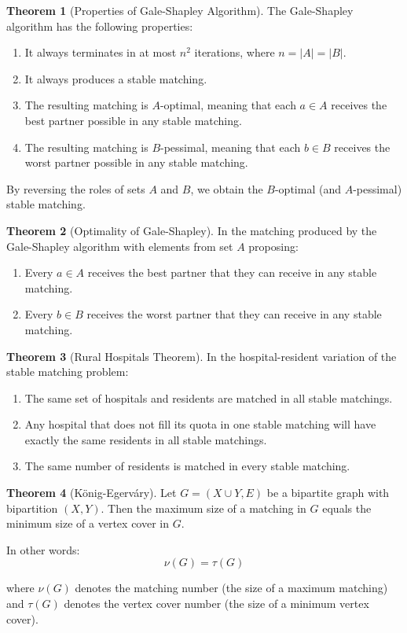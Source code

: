 \documentclass{article}
\theoremstyle{definition}
\newtheorem{theorem}{Theorem}
\begin{document}
\begin{theorem}[Properties of Gale-Shapley Algorithm]
The Gale-Shapley algorithm has the following properties:
\begin{enumerate}
    \item It always terminates in at most $n^2$ iterations, where $n = |A| = |B|$.
    \item It always produces a stable matching.
    \item The resulting matching is $A$-optimal, meaning that each $a \in A$ receives the best partner possible in any stable matching.
    \item The resulting matching is $B$-pessimal, meaning that each $b \in B$ receives the worst partner possible in any stable matching.
\end{enumerate}

By reversing the roles of sets $A$ and $B$, we obtain the $B$-optimal (and $A$-pessimal) stable matching.
\end{theorem}

\begin{theorem}[Optimality of Gale-Shapley]
In the matching produced by the Gale-Shapley algorithm with elements from set $A$ proposing:
\begin{enumerate}
    \item Every $a \in A$ receives the best partner that they can receive in any stable matching.
    \item Every $b \in B$ receives the worst partner that they can receive in any stable matching.
\end{enumerate}
\end{theorem}

\begin{theorem}[Rural Hospitals Theorem]
In the hospital-resident variation of the stable matching problem:
\begin{enumerate}
    \item The same set of hospitals and residents are matched in all stable matchings.
    \item Any hospital that does not fill its quota in one stable matching will have exactly the same residents in all stable matchings.
    \item The same number of residents is matched in every stable matching.
\end{enumerate}
\end{theorem}

\begin{theorem}[König-Egerváry]
Let $G = (X \cup Y, E)$ be a bipartite graph with bipartition $(X, Y)$. Then the maximum size of a matching in $G$ equals the minimum size of a vertex cover in $G$.

In other words:
\[
\nu(G) = \tau(G)
\]

where $\nu(G)$ denotes the matching number (the size of a maximum matching) and $\tau(G)$ denotes the vertex cover number (the size of a minimum vertex cover).
\end{theorem}
\end{document}
